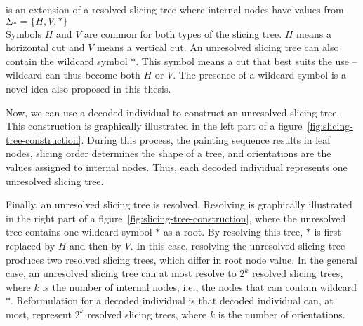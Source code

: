  is an extension of a resolved slicing tree where internal nodes have values from $\Sigma_* = \{H, V, *\}$ \\

Symbols $H$ and $V$ are common for both types of the slicing tree.
$H$ means a horizontal cut and $V$ means a vertical cut.
An unresolved slicing tree can also contain the wildcard symbol $*$.
This symbol means a cut that best suits the use – wildcard can thus become both $H$ or $V$.
The presence of a wildcard symbol is a novel idea also proposed in this thesis. 

Now, we can use a decoded individual to construct an unresolved slicing tree.
This construction is graphically illustrated in the left part of a figure~\ref{fig:slicing-tree-construction}.
During this process, the painting sequence results in leaf nodes, slicing order determines the shape of a tree, and orientations are the values assigned to internal nodes.
Thus, each decoded individual represents one unresolved slicing tree.

Finally, an unresolved slicing tree is resolved.
Resolving is graphically illustrated in the right part of a figure~\ref{fig:slicing-tree-construction},
where the unresolved tree contains one wildcard symbol $*$ as a root.
By resolving this tree, $*$ is first replaced by $H$ and then by $V$.
In this case, resolving the unresolved slicing tree produces two resolved slicing trees,
which differ in root node value.
In the general case, an unresolved slicing tree can at most resolve to $2^k$ resolved slicing trees,
where $k$ is the number of internal nodes, i.e., the nodes that can contain wildcard $*$.
Reformulation for a decoded individual is that decoded individual can, at most, represent
$2^k$ resolved slicing trees, where $k$ is the number of orientations.



